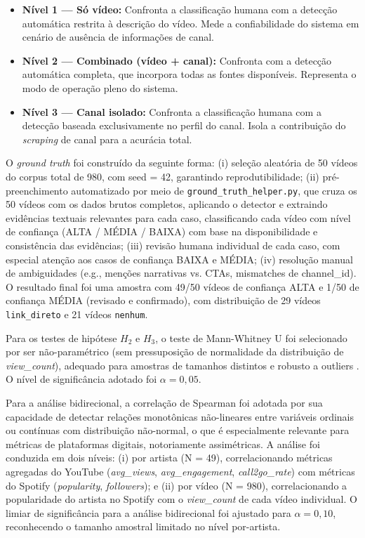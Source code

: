 \documentclass[12pt, a4paper]{article}
\begin{document}
\begin{itemize}
    \item \textbf{Nível 1 --- Só vídeo:} Confronta a classificação humana com a detecção automática restrita à descrição do vídeo. Mede a confiabilidade do sistema em cenário de ausência de informações de canal.
    \item \textbf{Nível 2 --- Combinado (vídeo + canal):} Confronta com a detecção automática completa, que incorpora todas as fontes disponíveis. Representa o modo de operação pleno do sistema.
    \item \textbf{Nível 3 --- Canal isolado:} Confronta a classificação humana com a detecção baseada exclusivamente no perfil do canal. Isola a contribuição do \textit{scraping} de canal para a acurácia total.
\end{itemize}

O \textit{ground truth} foi construído da seguinte forma: (i) seleção aleatória de 50 vídeos do corpus total de 980, com seed = 42, garantindo reprodutibilidade; (ii) pré-preenchimento automatizado por meio de \texttt{ground\_truth\_helper.py}, que cruza os 50 vídeos com os dados brutos completos, aplicando o detector e extraindo evidências textuais relevantes para cada caso, classificando cada vídeo com nível de confiança (ALTA / MÉDIA / BAIXA) com base na disponibilidade e consistência das evidências; (iii) revisão humana individual de cada caso, com especial atenção aos casos de confiança BAIXA e MÉDIA; (iv) resolução manual de ambiguidades (e.g., menções narrativas vs. CTAs, mismatches de channel\_id). O resultado final foi uma amostra com 49/50 vídeos de confiança ALTA e 1/50 de confiança MÉDIA (revisado e confirmado), com distribuição de 29 vídeos \texttt{link\_direto} e 21 vídeos \texttt{nenhum}.

Para os testes de hipótese $H_2$ e $H_3$, o teste de Mann-Whitney U foi selecionado por ser não-paramétrico (sem pressuposição de normalidade da distribuição de \textit{view\_count}), adequado para amostras de tamanhos distintos e robusto a outliers \cite{mann1947}. O nível de significância adotado foi $\alpha = 0{,}05$.

Para a análise bidirecional, a correlação de Spearman foi adotada por sua capacidade de detectar relações monotônicas não-lineares entre variáveis ordinais ou contínuas com distribuição não-normal, o que é especialmente relevante para métricas de plataformas digitais, notoriamente assimétricas. A análise foi conduzida em dois níveis: (i) por artista (N = 49), correlacionando métricas agregadas do YouTube (\textit{avg\_views}, \textit{avg\_engagement}, \textit{call2go\_rate}) com métricas do Spotify (\textit{popularity}, \textit{followers}); e (ii) por vídeo (N = 980), correlacionando a popularidade do artista no Spotify com o \textit{view\_count} de cada vídeo individual. O limiar de significância para a análise bidirecional foi ajustado para $\alpha = 0{,}10$, reconhecendo o tamanho amostral limitado no nível por-artista.
\end{document}
